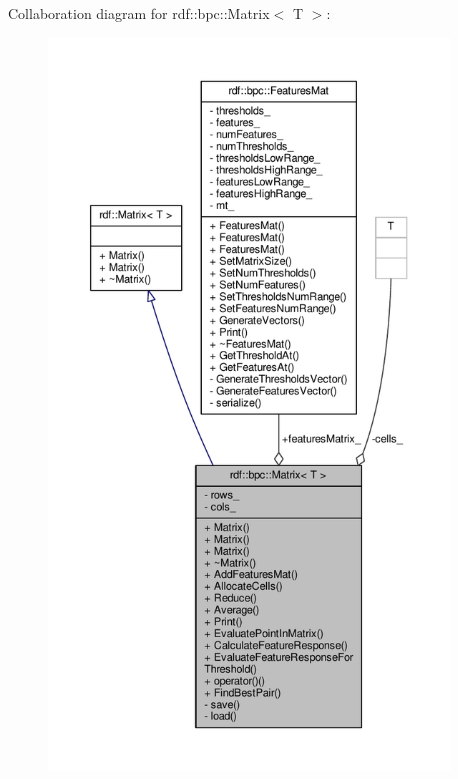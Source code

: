 Collaboration diagram for rdf\+:\+:bpc\+:\+:Matrix$<$ T $>$\+:
\nopagebreak
\begin{figure}[H]
\begin{center}
\leavevmode
\includegraphics[height=550pt]{classrdf_1_1bpc_1_1Matrix__coll__graph}
\end{center}
\end{figure}
